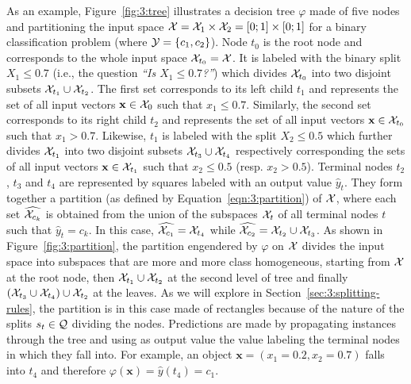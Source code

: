 As an example, Figure~\ref{fig:3:tree} illustrates a decision tree $\varphi$
made of five nodes and partitioning the input space ${\cal X} = {\cal X}_1
\times {\cal X}_2 = [0;1] \times [0; 1]$ for a binary classification problem
(where ${\cal Y}=\{ c_1, c_2 \}$). Node $t_0$ is the root node and corresponds
to the whole input space ${\cal X}_{t_0} = {\cal X}$. It is labeled with the binary
split $X_1 \leq 0.7$ (i.e., the question \textit{``Is $X_1 \leq 0.7$?''}) which divides ${\cal X}_{t_0}$ into two disjoint subsets
${\cal X}_{t_1} \cup {\cal X}_{t_2}$. The first set corresponds to its left
child $t_1$ and represents the set of all input vectors $\mathbf{x} \in {\cal
X}_0$ such that $x_1 \leq 0.7$. Similarly, the second set corresponds to its
right child $t_2$ and represents the set of all input vectors $\mathbf{x} \in
{\cal X}_{t_0}$ such that $x_1 > 0.7$. Likewise, $t_1$ is labeled with the
split $X_2 \leq 0.5$ which further divides ${\cal X}_{t_1}$ into two disjoint
subsets ${\cal X}_{t_3} \cup {\cal X}_{t_4}$ respectively corresponding the
sets of all input vectors $\mathbf{x} \in {\cal X}_{t_1}$ such that $x_2 \leq
0.5$ (resp. $x_2 > 0.5$). Terminal nodes $t_2$, $t_3$ and $t_4$ are represented
by squares labeled with an output value $\widehat{y}_t$. They form together a
partition (as defined by Equation~\ref{eqn:3:partition}) of ${\cal X}$, where
each set $\widehat{{\cal X}_{c_k}}$ is obtained from the union of the subspaces
${\cal X}_t$ of all terminal nodes $t$ such that $\widehat{y}_t = c_k$. In this
case, $\widehat{{\cal X}_{c_1}} = {\cal X}_{t_4}$ while $\widehat{{\cal
X}_{c_2}} = {\cal X}_{t_2} \cup {\cal X}_{t_3}$. As shown in
Figure~\ref{fig:3:partition}, the partition engendered by  $\varphi$ on ${\cal
X}$ divides the input space into subspaces that are more and more class
homogeneous, starting from ${\cal X}$ at the root node,  then ${\cal X}_{t_1}
\cup {\cal X}_{t_2}$ at the second level of tree and finally $({\cal X}_{t_3}
\cup {\cal X}_{t_4})\cup {\cal X}_{t_2}$ at the leaves.  As we will explore in
Section~\ref{sec:3:splitting-rules}, the partition is in this case made of
rectangles because of the nature of the splits $s_t \in {\cal Q}$ dividing the nodes.
Predictions are made by propagating instances through the tree and using as
output value the value labeling the terminal nodes in which they fall
into. For example, an object $\mathbf{x}=(x_1=0.2, x_2=0.7)$ falls into $t_4$
and therefore $\varphi(\mathbf{x}) = \widehat{y}(t_4) = c_1$.

